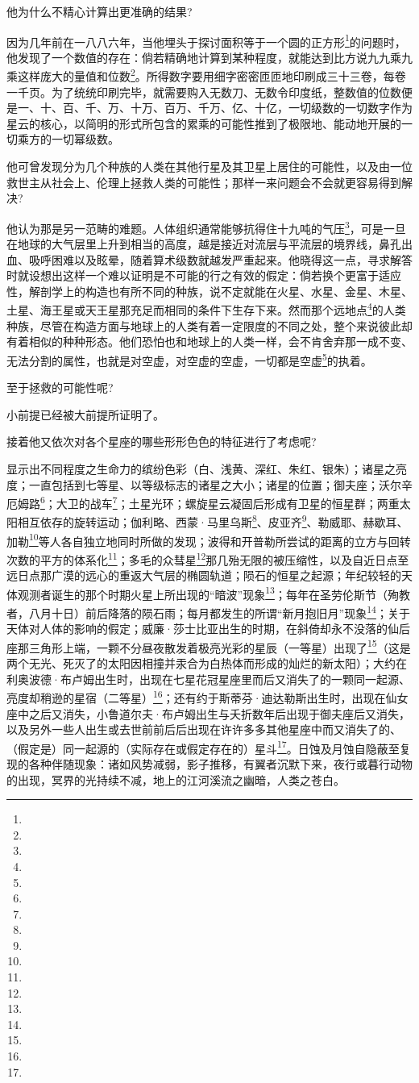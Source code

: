 \par 他为什么不精心计算出更准确的结果?
\par 因为几年前在一八八六年，当他埋头于探讨面积等于一个圆的正方形\footnote{}的问题时，他发现了一个数值的存在：倘若精确地计算到某种程度，就能达到比方说九九乘九乘这样庞大的量值和位数\footnote{}。所得数字要用细字密密匝匝地印刷成三十三卷，每卷一千页。为了统统印刷完毕，就需要购入无数刀、无数令印度纸，整数值的位数便是一、十、百、千、万、十万、百万、千万、亿、十亿，一切级数的一切数字作为星云的核心，以简明的形式所包含的累乘的可能性推到了极限地、能动地开展的一切乘方的一切幂级数。
\par 他可曾发现分为几个种族的人类在其他行星及其卫星上居住的可能性，以及由一位救世主从社会上、伦理上拯救人类的可能性；那样一来问题会不会就更容易得到解决?
\par 他认为那是另一范畴的难题。人体组织通常能够抗得住十九吨的气压\footnote{}，可是一旦在地球的大气层里上升到相当的高度，越是接近对流层与平流层的境界线，鼻孔出血、吸呼困难以及眩晕，随着算术级数就越发严重起来。他晓得这一点，寻求解答时就设想出这样一个难以证明是不可能的行之有效的假定：倘若换个更富于适应性，解剖学上的构造也有所不同的种族，说不定就能在火星、水星、金星、木星、土星、海王星或天王星那充足而相同的条件下生存下来。然而那个远地点\footnote{}的人类种族，尽管在构造方面与地球上的人类有着一定限度的不同之处，整个来说彼此却有着相似的种种形态。他们恐怕也和地球上的人类一样，会不肯舍弃那一成不变、无法分割的属性，也就是对空虚，对空虚的空虚，一切都是空虚\footnote{}的执着。
\par 至于拯救的可能性呢?
\par 小前提已经被大前提所证明了。
\par 接着他又依次对各个星座的哪些形形色色的特征进行了考虑呢?
\par 显示出不同程度之生命力的缤纷色彩（白、浅黄、深红、朱红、银朱）；诸星之亮度；一直包括到七等星、以等级标志的诸星之大小；诸星的位置；御夫座；沃尔辛厄姆路\footnote{}；大卫的战车\footnote{}；土星光环；螺旋星云凝固后形成有卫星的恒星群；两重太阳相互依存的旋转运动；伽利略、西蒙·马里乌斯\footnote{}、皮亚齐\footnote{}、勒威耶、赫歇耳、加勒\footnote{}等人各自独立地同时所做的发现；波得和开普勒所尝试的距离的立方与回转次数的平方的体系化\footnote{}；多毛的众彗星\footnote{}那几殆无限的被压缩性，以及自近日点至远日点那广漠的远心的重返大气层的椭圆轨道；陨石的恒星之起源；年纪较轻的天体观测者诞生的那个时期火星上所出现的“暗波”现象\footnote{}；每年在圣劳伦斯节（殉教者，八月十日）前后降落的陨石雨；每月都发生的所谓“新月抱旧月”现象\footnote{}；关于天体对人体的影响的假定；威廉·莎士比亚出生的时期，在斜倚却永不没落的仙后座那三角形上端，一颗不分昼夜散发着极亮光彩的星辰（一等星）出现了\footnote{}（这是两个无光、死灭了的太阳因相撞并汞合为白热体而形成的灿烂的新太阳）；大约在利奥波德·布卢姆出生时，出现在七星花冠星座里而后又消失了的一颗同一起源、亮度却稍逊的星宿（二等星）\footnote{}；还有约于斯蒂芬·迪达勒斯出生时，出现在仙女座中之后又消失，小鲁道尔夫·布卢姆出生与夭折数年后出现于御夫座后又消失，以及另外一些人出生或去世前前后后出现在许许多多其他星座中而又消失了的、（假定是）同一起源的（实际存在或假定存在的）星斗\footnote{}。日蚀及月蚀自隐蔽至复现的各种伴随现象：诸如风势减弱，影子推移，有翼者沉默下来，夜行或暮行动物的出现，冥界的光持续不减，地上的江河溪流之幽暗，人类之苍白。
